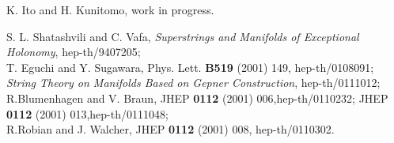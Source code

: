 \documentclass[a4paper,12pt]{article}
\begin{document}
\begin{thebibliography}{99}
K. Ito and H. Kunitomo, work in progress.

 S. L. Shatashvili and C. Vafa, 
{\it Superstrings and Manifolds of Exceptional Holonomy},
	hep-th/9407205;\\
T. Eguchi and Y. Sugawara, Phys. Lett. {\bf B519} (2001) 149,
	hep-th/0108091; {\it String Theory on \coordHE{} Manifolds Based on
	Gepner Construction}, hep-th/0111012;\\
R.Blumenhagen and V. Braun, JHEP {\bf 0112} (2001) 006,hep-th/0110232;
JHEP {\bf 0112} (2001) 013,hep-th/0111048;\\
R.Robian and J. Walcher, JHEP {\bf 0112} (2001) 008, hep-th/0110302.



\end{thebibliography}
\end{document}

